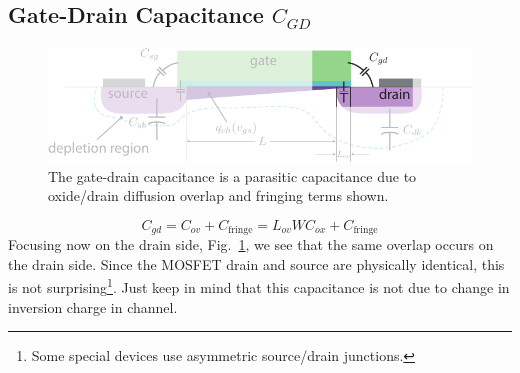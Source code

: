 \subsection{Gate-Drain Capacitance \texorpdfstring{$C_{GD}$}{}}
\begin{figure}[b]
\centering
\includegraphics[width=.75\columnwidth]{mos_caps_Cgd}
\caption{The gate-drain capacitance is a parasitic capacitance due to oxide/drain diffusion overlap and fringing terms shown.}
\label{fig:mos_caps_Cgd}
\end{figure}
    \begin{equation}
        C_{gd} = C_{ov} + C_{\text{fringe}} = L_{ov} W C_{ox} + C_{\text{fringe}}
    \end{equation}
Focusing now on the drain side, Fig.~\ref{fig:mos_caps_Cgd}, we see that the same overlap occurs on the drain side.  Since the MOSFET drain and source are physically identical, this is not surprising\footnote{Some special devices use asymmetric source/drain junctions.}.  Just keep in mind that this capacitance is not due to change in inversion charge in channel.
